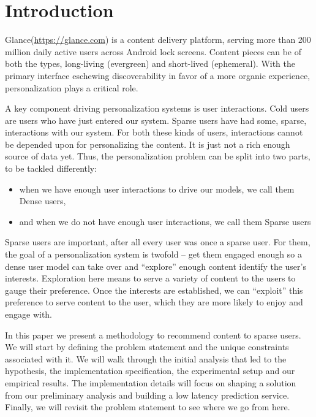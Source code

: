 \section{Introduction}
Glance(\url{https://glance.com}) is a content delivery platform, serving more than 200 million daily active users across Android lock screens. Content pieces can be of both the types, long-living (evergreen) and short-lived (ephemeral). With the primary interface eschewing discoverability in favor of a more organic experience, personalization plays a critical role.  

A key component driving personalization systems is user interactions. Cold users are users who have just entered our system. Sparse users have had some, sparse, interactions with our system. For both these kinds of users, interactions cannot be depended upon for personalizing the content. It is just not a rich enough source of data yet. Thus, the personalization problem can be split into two parts, to be tackled differently:    

\begin{itemize}
\item when we have enough user interactions to drive our models, we call them Dense users,
\item and when we do not have enough user interactions, we call them Sparse users
\end{itemize}

Sparse users are important, after all every user was once a sparse user. For them, the goal of a personalization system is twofold – get them engaged enough so a dense user model can take over and “explore” enough content identify the user’s interests. Exploration here means to serve a variety of content to the users to gauge their preference. Once the interests are established, we can “exploit” this preference to serve content to the user, which they are more likely to enjoy and engage with. 

In this paper we present a methodology to recommend content to sparse users. We will start by defining the problem statement and the unique constraints associated with it. We will walk through the initial analysis that led to the hypothesis, the implementation specification, the experimental setup and our empirical results. The implementation details will focus on shaping a solution from our preliminary analysis and building a low latency prediction service. Finally, we will revisit the problem statement to see where we go from here. 